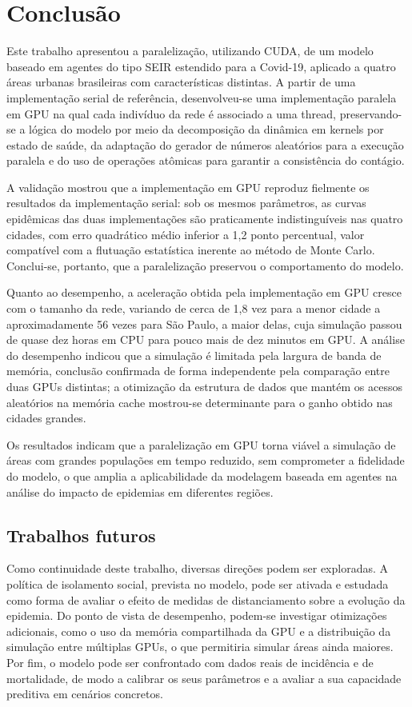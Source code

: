 \chapter{Conclusão}
\label{cap:conclusao}

Este trabalho apresentou a paralelização, utilizando CUDA, de um modelo baseado em agentes do tipo SEIR estendido para a Covid-19, aplicado a quatro áreas urbanas brasileiras com características distintas. A partir de uma implementação serial de referência, desenvolveu-se uma implementação paralela em GPU na qual cada indivíduo da rede é associado a uma thread, preservando-se a lógica do modelo por meio da decomposição da dinâmica em kernels por estado de saúde, da adaptação do gerador de números aleatórios para a execução paralela e do uso de operações atômicas para garantir a consistência do contágio.

A validação mostrou que a implementação em GPU reproduz fielmente os resultados da implementação serial: sob os mesmos parâmetros, as curvas epidêmicas das duas implementações são praticamente indistinguíveis nas quatro cidades, com erro quadrático médio inferior a 1,2 ponto percentual, valor compatível com a flutuação estatística inerente ao método de Monte Carlo. Conclui-se, portanto, que a paralelização preservou o comportamento do modelo.

Quanto ao desempenho, a aceleração obtida pela implementação em GPU cresce com o tamanho da rede, variando de cerca de 1,8 vez para a menor cidade a aproximadamente 56 vezes para São Paulo, a maior delas, cuja simulação passou de quase dez horas em CPU para pouco mais de dez minutos em GPU. A análise do desempenho indicou que a simulação é limitada pela largura de banda de memória, conclusão confirmada de forma independente pela comparação entre duas GPUs distintas; a otimização da estrutura de dados que mantém os acessos aleatórios na memória cache mostrou-se determinante para o ganho obtido nas cidades grandes.

Os resultados indicam que a paralelização em GPU torna viável a simulação de áreas com grandes populações em tempo reduzido, sem comprometer a fidelidade do modelo, o que amplia a aplicabilidade da modelagem baseada em agentes na análise do impacto de epidemias em diferentes regiões.

\section{Trabalhos futuros}

Como continuidade deste trabalho, diversas direções podem ser exploradas. A política de isolamento social, prevista no modelo, pode ser ativada e estudada como forma de avaliar o efeito de medidas de distanciamento sobre a evolução da epidemia. Do ponto de vista de desempenho, podem-se investigar otimizações adicionais, como o uso da memória compartilhada da GPU e a distribuição da simulação entre múltiplas GPUs, o que permitiria simular áreas ainda maiores. Por fim, o modelo pode ser confrontado com dados reais de incidência e de mortalidade, de modo a calibrar os seus parâmetros e a avaliar a sua capacidade preditiva em cenários concretos.
